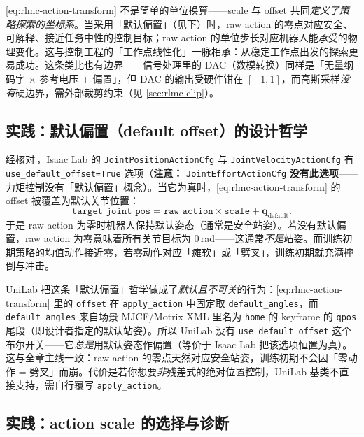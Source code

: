 \begin{insight}\label{ins:rlmc-scale-offset}
\cref{eq:rlmc-action-transform} 不是简单的单位换算——scale 与 offset 共同\emph{定义了策略探索的坐标系}。当采用「默认偏置」（见下）时，raw action 的零点对应安全、可解释、接近任务中性的控制目标；raw action 的单位步长对应机器人能承受的物理变化。这与控制工程的「工作点线性化」一脉相承：从稳定工作点出发的探索更易成功。这条类比也有边界——信号处理里的 DAC（数模转换）同样是「无量纲码字 $\times$ 参考电压 + 偏置」，但 DAC 的输出受硬件钳在 $[-1,1]$，而高斯采样\emph{没有}硬边界，需外部裁剪约束（见 \cref{sec:rlmc-clip}）。
\end{insight}

\subsection{实践：默认偏置（default offset）的设计哲学}
\label{sec:rlmc-offset}

经核对\,\cite{isaaclab2024}，Isaac Lab 的 \verb|JointPositionActionCfg| 与 \verb|JointVelocityActionCfg| 有 \verb|use_default_offset=True| 选项（\textbf{注意：} \verb|JointEffortActionCfg| \textbf{没有此选项}——力矩控制没有「默认偏置」概念）。当它为真时，\cref{eq:rlmc-action-transform} 的 offset 被覆盖为默认关节位置：
\begin{equation}
\texttt{target\_joint\_pos} = \texttt{raw\_action}\times\texttt{scale} + \mathbf q_{\text{default}}.
\label{eq:rlmc-default-offset}
\end{equation}
于是 raw action 为零时机器人保持默认姿态（通常是安全站姿）。若没有默认偏置，raw action 为零意味着所有关节目标为 $0\,$rad——这通常\emph{不是}站姿。而训练初期策略的均值动作接近零，若零动作对应「瘫软」或「劈叉」，训练初期就充满摔倒与冲击。

UniLab 把这条「默认偏置」哲学做成了\emph{默认且不可关}的行为：\cref{eq:rlmc-action-transform} 里的 \verb|offset| 在 \verb|apply_action| 中固定取 \verb|default_angles|，而 \verb|default_angles| 来自场景 MJCF/Motrix XML 里名为 \verb|home| 的 keyframe 的 \verb|qpos| 尾段（即设计者指定的默认站姿）。所以 UniLab 没有 \verb|use_default_offset| 这个布尔开关——它\emph{总是}用默认姿态作偏置（等价于 Isaac Lab 把该选项恒置为真）。这与全章主线一致：raw action 的零点天然对应安全站姿，训练初期不会因「零动作 = 劈叉」而崩。代价是若你想要\emph{非}残差式的绝对位置控制，UniLab 基类不直接支持，需自行覆写 \verb|apply_action|。

\subsection{实践：action scale 的选择与诊断}
\label{sec:rlmc-action-scale}

